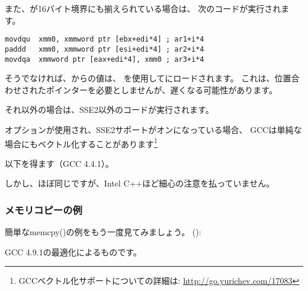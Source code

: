 また、が16バイト境界にも揃えられている場合は、
次のコードが実行されます。

\begin{lstlisting}[style=customasmx86]
movdqu  xmm0, xmmword ptr [ebx+edi*4] ; ar1+i*4
paddd   xmm0, xmmword ptr [esi+edi*4] ; ar2+i*4
movdqa  xmmword ptr [eax+edi*4], xmm0 ; ar3+i*4
\end{lstlisting}

そうでなければ、からの値は、 \MOVDQU を使用してにロードされます。
これは、位置合わせされたポインターを必要としませんが、遅くなる可能性があります。



それ以外の場合は、SSE2以外のコードが実行されます。


\newcommand{\URLGCCVEC}{\url{http://go.yurichev.com/17083}}

\Othree オプションが使用され、SSE2サポートがオンになっている場合、
GCCは単純な場合にもベクトル化することがあります\footnote{GCCベクトル化サポートについての詳細は: \URLGCCVEC}

以下を得ます（GCC 4.4.1）。



しかし、ほぼ同じですが、Intel C++ほど細心の注意を払っていません。

\subsubsection{メモリコピーの例}
\label{vec_memcpy}

簡単なmemcpy()の例をもう一度見てみましょう。
():



GCC 4.9.1の最適化によるものです。


